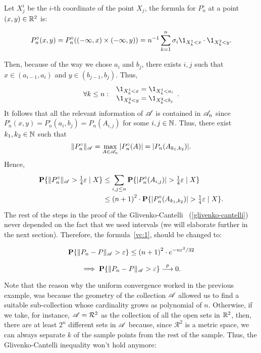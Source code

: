 \vspace*{1em}

Let $X^i_j$ be the $i$-th coordinate of the point $X_j$, the formula for $P_n^\circ$ at a point $(x,y) \in \R^2$ is:

\[ P_n^\circ(x,y) = P_n^\circ((-\infty, x)\times(-\infty, y)) = n^{-1} \sum_{k = 1}^{n} \sigma_i \1_{X_k^1 < x}\cdot \1_{X_k^2 < y}. \] 

Then, because of the way we chose $a_i$ and $b_j$, there exists $i, j$ such that $x \in (a_{i-1}, a_i)$ and $y \in (b_{j-1}, b_j)$. Thus,
\[ \forall k \leq n:\; \begin{array}{c}
    \1_{X_k^1 < x} = \1_{X_k^1 < a_i}\\
    \1_{X_k^2 < y} = \1_{X_k^2 < b_j}
\end{array} .\] 
It follows that all the relevant information of $\AA$ is contained in $\AA_n$ since $P_n^\circ(x,y) = P_n^\circ(a_{i},b_{j}) = P_n(A_{i,j})$ for some $i,j \in\N$. Thus, there exist $k_1, k_2\in \N$ such that
\[ \|P_n^\circ\|_\AA = \max_{A \in \AA_n}|P_n^\circ(A)| =  |P_n(A_{k_1,k_2})|. \]
Hence, 
\begin{equation} \label{vc:2}
    \everymath{\displaystyle}\arraycolsep=1.4pt\def\arraystretch{1.5}
    \begin{array}{rcl}
    \P\{ \|P_n^\circ\|_\AA > \tfrac{1}{4} \varepsilon \;|\; X \} & \leq & \sum_{i,j \leq n}\P\{ |P_n^\circ(A_{i,j})| > \tfrac{1}{4} \varepsilon \;|\; X \}\\
    & \leq & {(n+1)}^2 \cdot \P\{ |P_n^\circ(A_{k_1,k_2})| > \tfrac{1}{4} \varepsilon \;|\; X \} .
  \end{array}
\end{equation}
The rest of the steps in the proof of the Glivenko-Cantelli ~(\ref{glivenko-cantelli}) never depended on the fact that we used intervals (we will elaborate further in the next section). Therefore, the formula~\ref{vc:1}, should be changed to:

\begin{equation}
    \label{vc:3}
    \P\{\|P_n-P\|_{\AA} > \varepsilon\} \leq {(n+1)}^2 \cdot e^{-n \varepsilon^2 / 32}
\end{equation}

\[ \implies \P\{\|P_n-P\|_\AA > \varepsilon\} \overset{p}{\longrightarrow} 0.  \] 

Note that the reason why the uniform convergence worked in the previous example, was because the geometry of the collection $\AA$ allowed us to find a suitable sub-collection whose cardinality grows as polynomial of $n$. Otherwise, if we take, for instance, $\AA = \mathcal{R}^2$ as the collection of all the open sets in $\R^2$, then, there are at least $2^{n}$ different sets in $\AA$ because, since $\mathcal{R}^2$ is a metric space, we can always separate $k$ of the sample points from the rest of the sample. Thus, the Glivenko-Cantelli inequality won't hold anymore:

